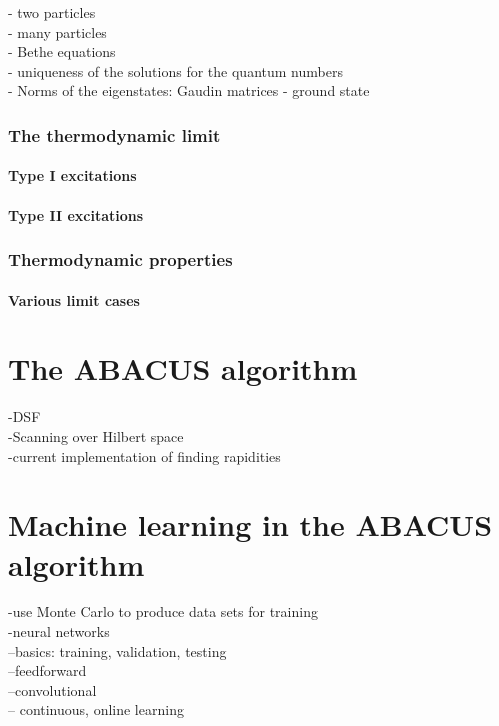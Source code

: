 \documentclass[11pt, a4paper,draft]{report} %
\begin{document}
- two particles \\
- many particles\\
- Bethe equations\\
- uniqueness of the solutions for the quantum numbers\\
- Norms of the eigenstates: Gaudin matrices
- ground state

\subsection{The thermodynamic limit}

\subsubsection{Type I excitations}

\subsubsection{Type II excitations}

\subsection{Thermodynamic properties}

\subsubsection{Various limit cases}






\chapter{The ABACUS algorithm}

-DSF\\
-Scanning over Hilbert space\\
-current implementation of finding rapidities\\





\chapter{Machine learning in the ABACUS algorithm}

-use Monte Carlo to produce data sets for training\\
-neural networks\\
--basics: training, validation, testing\\
--feedforward\\
--convolutional\\
-- continuous, online learning
\end{document}
